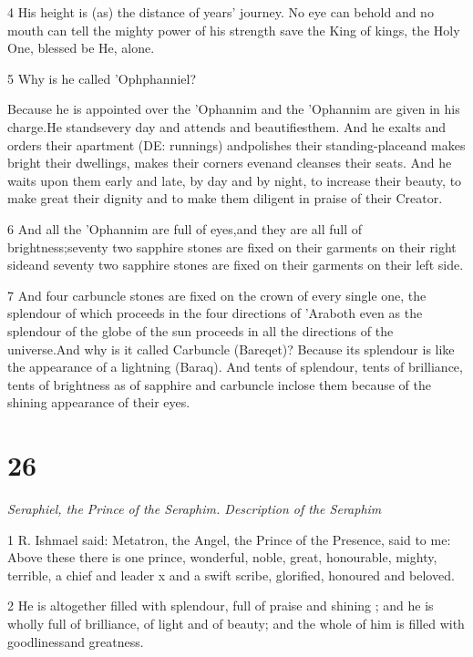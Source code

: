 \par 4 His height is (as) the distance of years' journey. No eye can behold and no mouth can tell the mighty power of his strength save the King of kings, the Holy One, blessed be He, alone. 

\par 5 Why is he called 'Ophphanniel? 

\par Because he is appointed over the 'Ophannim and the 'Ophannim are given in his charge.He standsevery day and attends and beautifiesthem. And he exalts and orders their apartment (DE: runnings) andpolishes their standing-placeand makes bright their dwellings, makes their corners evenand cleanses their seats. And he waits upon them early and late, by day and by night, to increase their beauty, to make great their dignity and to make them diligent in praise of their Creator. 

\par 6 And all the 'Ophannim are full of eyes,and they are all full of brightness;seventy two sapphire stones are fixed on their garments on their right sideand seventy two sapphire stones are fixed on their garments on their left side.

\par 7 And four carbuncle stones are fixed on the crown of every single one, the splendour of which proceeds in the four directions of 'Araboth even as the splendour of the globe of the sun proceeds in all the directions of the universe.And why is it called Carbuncle (Bareqet)? Because its splendour is like the appearance of a lightning (Baraq). And tents of splendour, tents of brilliance, tents of brightness as of sapphire and carbuncle inclose them because of the shining appearance of their eyes. 

\chapter{26}

\par \textit{Seraphiel, the Prince of the Seraphim. Description of the Seraphim}

\par 1 R. Ishmael said: Metatron, the Angel, the Prince of the Presence, said to me: Above these there is one prince, wonderful, noble, great, honourable, mighty, terrible, a chief and leader x and a swift scribe, glorified, honoured and beloved. 

\par 2 He is altogether filled with splendour, full of praise and shining ; and he is wholly full of brilliance, of light and of beauty; and the whole of him is filled with goodlinessand greatness. 

